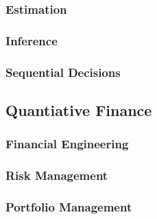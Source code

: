 \documentclass[../main.tex]{subfiles}
\begin{document}
\subsubsection{Estimation}

\subsubsection{Inference}

\subsubsection{Sequential Decisions}

\subsection{Quantiative Finance}

\subsubsection{Financial Engineering}

\subsubsection{Risk Management}

\subsubsection{Portfolio Management}
\end{document}
